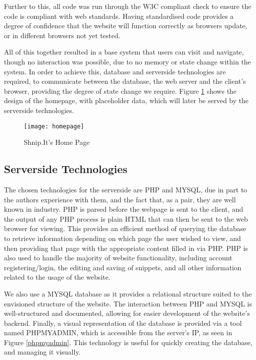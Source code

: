 Further to this, all code was run through the W3C compliant check to ensure the code is compliant with web standards.
Having standardised code provides a degree of confidence that the website will function correctly as browsers update, or in different browsers not yet tested.

All of this together resulted in a base system that users can visit and navigate, though no interaction was possible, due to no memory or state change within the system.
In order to achieve this, database and serverside technologies are required, to communicate between the database, the web server and the client's browser, providing the degree of state change we require.
Figure \ref{homepage} shows the design of the homepage, with placeholder data, which will later be served by the serverside technologies.

\begin{figure}[htb!]
  \centering
  \texttt{[image: homepage]}
  \caption{Shnip.It's Home Page \label{homepage}}
\end{figure}

\subsection{Serverside Technologies}
The chosen technologies for the serverside are PHP and MYSQL, due in part to the authors experience with them, and the fact that, as a pair, they are well known in industry.
PHP is parsed before the webpage is sent to the client, and the output of any PHP process is plain HTML that can then be sent to the web browser for viewing.
This provides an efficient method of querying the database to retrieve information depending on which page the user wished to view, and then providing that page with the appropriate content filled in via PHP.
PHP is also used to handle the majority of website functionality, including account registering/login, the editing and saving of snippets, and all other information related to the usage of the website.

We also use a MYSQL database as it provides a relational structure suited to the envisioned structure of the website. 
The interaction between PHP and MYSQL is well-structured and documented, allowing for easier development of the website's backend.
Finally, a visual representation of the database is provided via a tool named PHPMYADMIN, which is accessible from the server's IP, as seen in Figure \ref{phpmyadmin}.
This technology is useful for quickly creating the database, and managing it visually.

